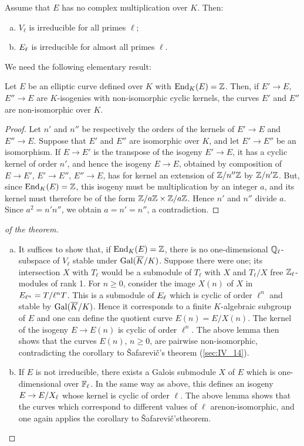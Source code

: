 \begin{thm}
Assume that $E$ has no complex multiplication over $K$.
\dpage
Then:
\begin{enumerate}[(a)]
\item\label{thm:IV_21_a} $V_\ell$ is irreducible for all primes $\ell$;
\item ${E}_{\ell}$ is irreducible for almost all primes $\ell$.
\end{enumerate}
\end{thm}

We need the following elementary result:
\begin{lem}
Let $E$ be an elliptic curve defined over $K$ with $\operatorname{End}_K(E) = \mathbb{Z}$. Then, if
$E' \to E$, $E'' \to E$ are $K$-isogenies with non-isomorphic cyclic kernels,
the curves $E'$ and $E''$ are non-isomorphic over $K$.
\end{lem}
\begin{proof}
Let $n'$ and $n''$ be respectively the orders of the kernels of
$E' \to E$ and $E'' \to E$. Suppose that $E'$ and $E''$ are isomorphic
over $K$, and let $E' \to E''$ be an isomorphism. If $E \to E'$ is the
transpose of the isogeny $E' \to E$, it has a cyclic kernel of order
$n'$, and hence the isogeny $E \to E$, obtained by composition of
$E \to E'$, $E' \to E''$, $E'' \to E$, has for kernel an extension of
$\mathbb{Z}/n''\mathbb{Z}$ by $\mathbb{Z}/n'\mathbb{Z}$. But, since $\operatorname{End}_K(E) = \mathbb{Z}$, this isogeny must be
multiplication by an integer $a$, and its kernel must therefore be of
the form $\mathbb{Z}/a\mathbb{Z} \times \mathbb{Z}/a\mathbb{Z}$. Hence $n'$ and $n''$ divide $a$. Since
$a^2 = n'n''$, we obtain $a = n' = n''$, a contradiction.
\end{proof}

\begin{proof}[ of the theorem]
\begin{enumerate}[(a)]
\item It suffices to show that, if $\operatorname{End}_K(E) = \mathbb{Z}$, there is no
	one-dimensional $\mathbb{Q}_\ell$-subspace of $V_\ell$ stable under
	$\operatorname{Gal}(\overline{K}/K)$. Suppose there were one; its intersection $X$ with
	$T_\ell$ would be a submodule of $T_\ell$ with $X$ and $T_\ell/X$ free
	$\mathbb{Z}_\ell$-modules of rank 1. For $n \ge 0$, consider the image $X(n)$ of
	$X$ in ${E}_{\ell^n} = T/\ell^n T$. This is a submodule of
	${E}_{\ell}$ which is cyclic of order $\ell^n$ and stable by
	$\operatorname{Gal}(\overline{K}/K)$.  Hence it corresponds to a finite $K$-algebraic
	\dpage
	subgroup of $E$ and one can define the quotient curve $E(n) = E/X(n)$.
	The kernel of the isogeny $E \to E(n)$ is cyclic of order $\ell^n$. The
	above lemma then shows that the curves $E(n)$, $n \ge 0$, are pairwise
	non-isomorphic, contradicting the corollary to \v Safarevi\v c's
	theorem (\ref{sec:IV_14}).
\item If $E$ is not irreducible, there exists a Galois submodule $X$ of $E$
	which is one-dimensional over $\mathbb{F}_\ell$. In the same way as above, this
	defines an isogeny $E \to E/{X}_{\ell}$ whose kernel is cyclic of
	order $\ell$. The above lemma shows that the curves which correspond to
	different values of $\ell$ are\break non-isomorphic, and one again
	applies the corollary to \v Safarevi\v c's\break theorem.
	\qedhere
\end{enumerate}
\end{proof}

